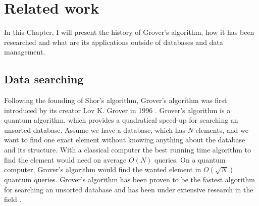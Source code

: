 \documentclass[english,oneside,openright]{UH_DS_report}
\begin{document}
\chapter{Related work}
\label{chapter:relatedwork}

In this Chapter, I will present the history of Grover's algorithm, how it has been researched and what are its applications outside of databases and data management.



\section{Data searching}

Following the founding of Shor's algorithm, Grover's algorithm was first introduced by its creator Lov K. Grover in 1996 \cite{grover1996fast}. Grover's algorithm is a quantum algorithm, which provides a quadratical speed-up for searching an unsorted database. Assume we have a database, which has $N$ elements, and we want to find one exact element without knowing anything about the database and its structure. With a classical computer the best running time algorithm to find the element would need on average $O(N)$ queries. On a quantum computer, Grover's algorithm would find the wanted element in $O(\sqrt{N})$ quantum queries. Grover's algorithm has been proven to be the fastest algorithm for searching an unsorted database \cite{giri2017review, introtoqc} and has been under extensive research in the field \cite{giri2017review}.
\end{document}
